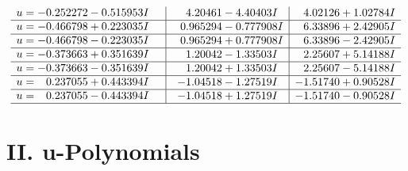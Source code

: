 \documentclass[1p]{elsarticle_modified}
\theoremstyle{definition}
\begin{document}
$$\begin{array}{c|c|c}
\begin{aligned}
u &= -0.252272 - 0.515953 I\end{aligned}
 & \phantom{-}4.20461 - 4.40403 I & \phantom{-}4.02126 + 1.02784 I \\ \hline\begin{aligned}
u &= -0.466798 + 0.223035 I\end{aligned}
 & \phantom{-}0.965294 - 0.777908 I & \phantom{-}6.33896 + 2.42905 I \\ \hline\begin{aligned}
u &= -0.466798 - 0.223035 I\end{aligned}
 & \phantom{-}0.965294 + 0.777908 I & \phantom{-}6.33896 - 2.42905 I \\ \hline\begin{aligned}
u &= -0.373663 + 0.351639 I\end{aligned}
 & \phantom{-}1.20042 - 1.33503 I & \phantom{-}2.25607 + 5.14188 I \\ \hline\begin{aligned}
u &= -0.373663 - 0.351639 I\end{aligned}
 & \phantom{-}1.20042 + 1.33503 I & \phantom{-}2.25607 - 5.14188 I \\ \hline\begin{aligned}
u &= \phantom{-}0.237055 + 0.443394 I\end{aligned}
 & -1.04518 - 1.27519 I & -1.51740 + 0.90528 I \\ \hline\begin{aligned}
u &= \phantom{-}0.237055 - 0.443394 I\end{aligned}
 & -1.04518 + 1.27519 I & -1.51740 - 0.90528 I\\
 \hline 
 \end{array}$$\newpage
\newpage\renewcommand{\arraystretch}{1}
\centering \section*{ II. u-Polynomials}
\end{document}
